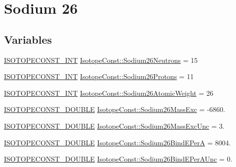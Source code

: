 \hypertarget{group___isotope_const-_sodium-_na26}{}\section{Sodium 26}
\label{group___isotope_const-_sodium-_na26}
\subsection*{Variables}
\begin{DoxyCompactItemize}
\item 
\mbox{\hyperlink{group___isotope_const-_macros_ga5f18360b3e99483a35c32d789e62621c}{I\+S\+O\+T\+O\+P\+E\+C\+O\+N\+S\+T\+\_\+\+I\+NT}} \mbox{\hyperlink{group___isotope_const-_sodium-_na26_gafe40abe9f2f93d9d341ab4f7935b75ca}{Isotope\+Const\+::\+Sodium26\+Neutrons}} = 15
\item 
\mbox{\hyperlink{group___isotope_const-_macros_ga5f18360b3e99483a35c32d789e62621c}{I\+S\+O\+T\+O\+P\+E\+C\+O\+N\+S\+T\+\_\+\+I\+NT}} \mbox{\hyperlink{group___isotope_const-_sodium-_na26_ga5964faceed2deaa00df4cdd2563b96b7}{Isotope\+Const\+::\+Sodium26\+Protons}} = 11
\item 
\mbox{\hyperlink{group___isotope_const-_macros_ga5f18360b3e99483a35c32d789e62621c}{I\+S\+O\+T\+O\+P\+E\+C\+O\+N\+S\+T\+\_\+\+I\+NT}} \mbox{\hyperlink{group___isotope_const-_sodium-_na26_ga3dcbdb52cf8d44b56112121e5ca0dd09}{Isotope\+Const\+::\+Sodium26\+Atomic\+Weight}} = 26
\item 
\mbox{\hyperlink{group___isotope_const-_macros_ga8f45a7272ce02c0b4c65c44636ed719a}{I\+S\+O\+T\+O\+P\+E\+C\+O\+N\+S\+T\+\_\+\+D\+O\+U\+B\+LE}} \mbox{\hyperlink{group___isotope_const-_sodium-_na26_gaf85d6768f452d42bbacd8b37a4f53db5}{Isotope\+Const\+::\+Sodium26\+Mass\+Exc}} = -\/6860.
\item 
\mbox{\hyperlink{group___isotope_const-_macros_ga8f45a7272ce02c0b4c65c44636ed719a}{I\+S\+O\+T\+O\+P\+E\+C\+O\+N\+S\+T\+\_\+\+D\+O\+U\+B\+LE}} \mbox{\hyperlink{group___isotope_const-_sodium-_na26_gaa71b84fa271039414a0a5f41931ee577}{Isotope\+Const\+::\+Sodium26\+Mass\+Exc\+Unc}} = 3.
\item 
\mbox{\hyperlink{group___isotope_const-_macros_ga8f45a7272ce02c0b4c65c44636ed719a}{I\+S\+O\+T\+O\+P\+E\+C\+O\+N\+S\+T\+\_\+\+D\+O\+U\+B\+LE}} \mbox{\hyperlink{group___isotope_const-_sodium-_na26_gafe1c79609c2abbdd4771f564fff9135b}{Isotope\+Const\+::\+Sodium26\+Bind\+E\+PerA}} = 8004.
\item 
\mbox{\hyperlink{group___isotope_const-_macros_ga8f45a7272ce02c0b4c65c44636ed719a}{I\+S\+O\+T\+O\+P\+E\+C\+O\+N\+S\+T\+\_\+\+D\+O\+U\+B\+LE}} \mbox{\hyperlink{group___isotope_const-_sodium-_na26_gafa79dc6aadc95037f8e07ee573909b98}{Isotope\+Const\+::\+Sodium26\+Bind\+E\+Per\+A\+Unc}} = 0.

\end{DoxyCompactItemize}
